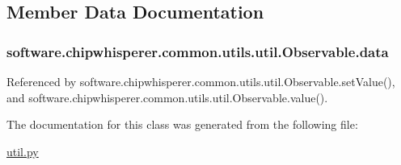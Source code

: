 \subsection{Member Data Documentation}
\hypertarget{classsoftware_1_1chipwhisperer_1_1common_1_1utils_1_1util_1_1Observable_adc61033cce81ccc67781a018fff6764a}{}
\subsubsection[{data}]{\setlength{\rightskip}{0pt plus 5cm}software.\+chipwhisperer.\+common.\+utils.\+util.\+Observable.\+data}\label{classsoftware_1_1chipwhisperer_1_1common_1_1utils_1_1util_1_1Observable_adc61033cce81ccc67781a018fff6764a}


Referenced by software.\+chipwhisperer.\+common.\+utils.\+util.\+Observable.\+set\+Value(), and software.\+chipwhisperer.\+common.\+utils.\+util.\+Observable.\+value().



The documentation for this class was generated from the following file\+:\begin{DoxyCompactItemize}
\item 
\hyperlink{util_8py}{util.\+py}\end{DoxyCompactItemize}
